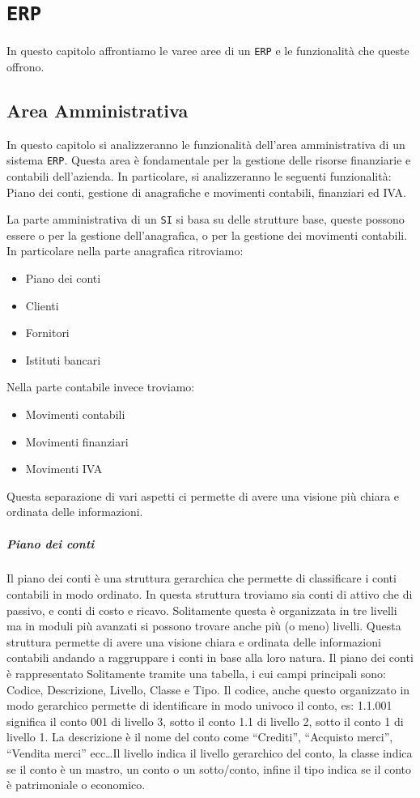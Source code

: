 \chapter{\texttt{ERP}}
\thispagestyle{chapterInit}
In questo capitolo affrontiamo le varee aree di un \texttt{ERP} e le funzionalità che queste offrono.
\section{Area Amministrativa}
    In questo capitolo si analizzeranno le funzionalità dell'area amministrativa di un sistema \texttt{ERP}. Questa area è fondamentale per la gestione delle risorse finanziarie e contabili dell'azienda. In particolare, si analizzeranno le seguenti funzionalità: Piano dei conti, gestione di anagrafiche e movimenti contabili, finanziari ed IVA.

    La parte amministrativa di un \texttt{SI} si basa su delle strutture base, queste possono essere o per la gestione dell'anagrafica, o per la gestione dei movimenti contabili. In particolare nella parte anagrafica ritroviamo: \begin{itemize}
        \item Piano dei conti
        \item Clienti
        \item Fornitori
        \item Istituti bancari
    \end{itemize}
    Nella parte contabile invece troviamo: \begin{itemize}
        \item Movimenti contabili
        \item Movimenti finanziari
        \item Movimenti IVA
    \end{itemize}
    Questa separazione di vari aspetti ci permette di avere una visione più chiara e ordinata delle informazioni.
    \paragraph{Piano dei conti} Il piano dei conti è una struttura gerarchica che permette di classificare i conti contabili in modo ordinato. In questa struttura troviamo sia conti di attivo che di passivo, e conti di costo e ricavo. Solitamente questa è organizzata in tre livelli ma in moduli più avanzati si possono trovare anche più (o meno) livelli. Questa struttura permette di avere una visione chiara e ordinata delle informazioni contabili andando a raggruppare i conti in base alla loro natura. Il piano dei conti è rappresentato Solitamente tramite una tabella, i cui campi principali sono: Codice, Descrizione, Livello, Classe e Tipo. Il codice, anche questo organizzato in modo gerarchico permette di identificare in modo univoco il conto, es: 1.1.001 significa il conto 001 di livello 3, sotto il conto 1.1 di livello 2, sotto il conto 1 di livello 1. La descrizione è il nome del conto come ``Crediti'', ``Acquisto merci'', ``Vendita merci'' ecc\dots Il livello indica il livello gerarchico del conto, la classe indica se il conto è un mastro, un conto o un sotto/conto, infine il tipo indica se il conto è patrimoniale o economico.
